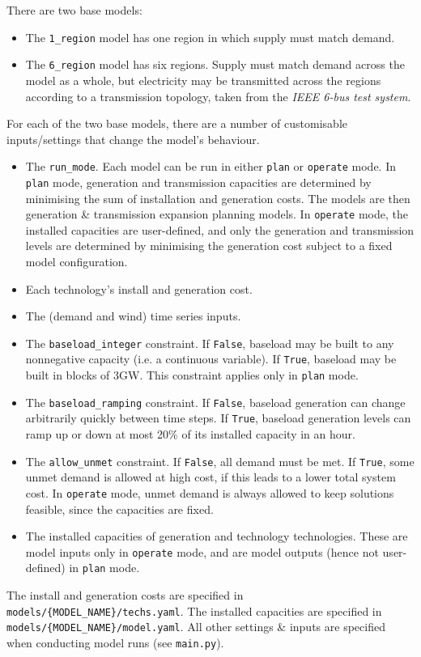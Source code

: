\documentclass[preprint]{elsarticle}
\begin{document}
\noindent There are two base models:
\begin{itemize}
\item The \texttt{1\_region} model has one region in which supply must match demand.
\item The \texttt{6\_region} model has six regions. Supply must match demand across the model as a whole, but electricity may be transmitted across the regions according to a transmission topology, taken from the \textit{IEEE 6-bus test system}.
\end{itemize}
For each of the two base models, there are a number of customisable inputs/settings that change the model's behaviour.
\begin{itemize}
\item The \texttt{run\_mode}. Each model can be run in either \texttt{plan} or \texttt{operate} mode. In \texttt{plan} mode, generation and transmission capacities are determined by minimising the sum of installation and generation costs. The models are then generation \& transmission expansion planning models. In \texttt{operate} mode, the installed capacities are user-defined, and only the generation and transmission levels are determined by minimising the generation cost subject to a fixed model configuration.
\item Each technology's install and generation cost. 
\item The (demand and wind) time series inputs.
\item The \texttt{baseload\_integer} constraint. If \texttt{False}, baseload may be built to any nonnegative capacity (i.e. a continuous variable). If \texttt{True}, baseload may be built in blocks of 3GW. This constraint applies only in \texttt{plan} mode.
\item The \texttt{baseload\_ramping} constraint. If \texttt{False}, baseload generation can change arbitrarily quickly between time steps. If \texttt{True}, baseload generation levels can ramp up or down at most 20\% of its installed capacity in an hour.
\item The \texttt{allow\_unmet} constraint. If \texttt{False}, all demand must be met. If \texttt{True}, some unmet demand is allowed at high cost, if this leads to a lower total system cost. In \texttt{operate} mode, unmet demand is always allowed to keep solutions feasible, since the capacities are fixed.
\item The installed capacities of generation and technology technologies. These are model inputs only in \texttt{operate} mode, and are model outputs (hence not user-defined) in \texttt{plan} mode.
\end{itemize}
The install and generation costs are specified in \texttt{models/\{MODEL\_NAME\}/techs.yaml}. The installed capacities are specified in \texttt{models/\{MODEL\_NAME\}/model.yaml}. All other settings \& inputs are specified when conducting model runs (see \texttt{main.py}).
\end{document}
